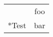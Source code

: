 \begin{tabular}{|cc|} \hline
 & foo \\
\rowcolor{lightgray}
\multirow{-2}*{Test} & bar \\\hline
\end{tabular}
